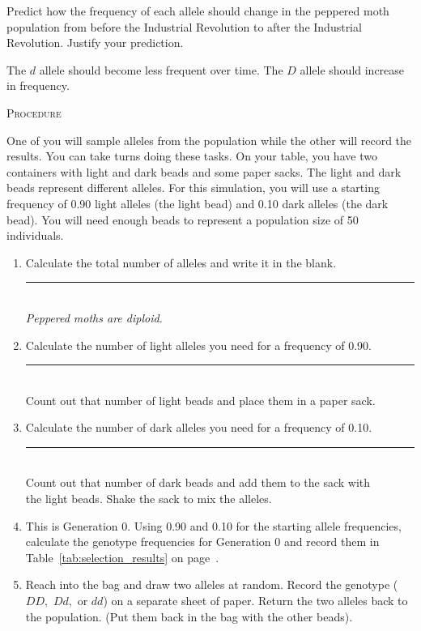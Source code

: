 \documentclass[12pt]{exam}
\newcommand*\AnswerBox[2]{%
    \parbox[t][#1]{0.92\textwidth}{%
    \begin{solution}#2\end{solution}}
    \vspace{\stretch{1}}
}
\newcommand{\allele}[1]{$#1$}
\begin{document}
\begin{questions}

\question\label{ques:selection_prediction}
Predict how the frequency of each allele should change in the peppered moth population from before the Industrial Revolution to after the Industrial Revolution. Justify your prediction.

\AnswerBox{2\baselineskip}{The \allele{d} allele should become less frequent over time. The \allele{D} allele should increase in frequency.}

\newpage

\textsc{Procedure}

\medskip

One of you will sample alleles from the population while the other will record the results. You can take turns doing these tasks.  On your table, you have two containers with light and dark beads and some paper sacks. The light and dark beads represent different alleles. For this simulation, you will use a starting frequency of 0.90 light alleles (the light bead) and 0.10 dark alleles (the dark bead). You will need enough beads to represent a population size of 50 individuals.

\begin{enumerate}

	\item Calculate the total number of alleles and write it in the blank. \hfill \rule{0.5in}{0.4pt}\\ \emph{Peppered moths are diploid.} 
	
	\item Calculate the number of light alleles you need for a frequency of 0.90. \hfill \rule{0.5in}{0.4pt} \\ Count out that number of light beads and place them in a paper sack. 
	
	\item Calculate the number of dark alleles you need for a frequency of 0.10. \hfill \rule{0.5in}{0.4pt} \\ Count out that number of dark beads and add them to the sack with \\
	the light beads. Shake the sack to mix the alleles.
	
	\item This is Generation 0. Using 0.90 and 0.10 for the starting allele frequencies, calculate the genotype frequencies for Generation 0 and record them in Table~\ref{tab:selection_results} on page~\pageref{tab:selection_results}.
	
	\item \label{selection_sample_start} Reach into the bag and draw two alleles at random. Record the genotype (\allele{DD,} \allele{Dd,} or \allele{dd}) on a separate sheet of paper. Return the two alleles back to the population. (Put them back in the bag with the other beads).
	

\end{enumerate}
\end{questions}
\end{document}

